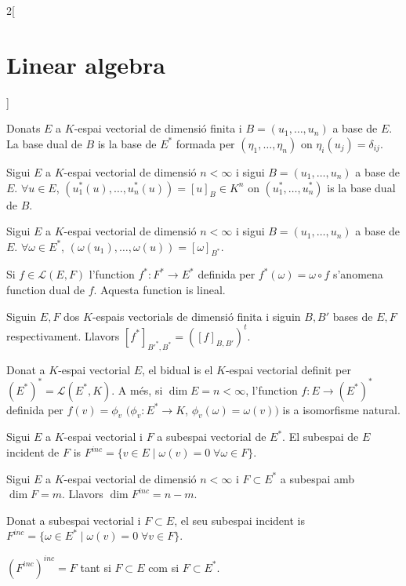 \documentclass[../../../main.tex]{subfiles}
\begin{document}
\begin{multicols}{2}[\section{Linear algebra}]
\begin{definition}
\end{definition}
\begin{definition}
Donats $E$ a $K$-espai vectorial de dimensió finita i $B=(u_1,\ldots,u_n)$ a base de $E$. La base dual de $B$ is la base de $E^*$ formada per $(\eta_1,\ldots,\eta_n)$ on $\eta_i(u_j)=\delta_{ij}$.
\end{definition}
\begin{lemma}
Sigui $E$ a $K$-espai vectorial de dimensió $n<\infty$ i sigui $B=(u_1,\ldots,u_n)$ a base de $E$. $\forall u\in E$, $(u_1^*(u),\ldots,u_n^*(u))=[u]_B\in K^n$ on $(u_1^*,\ldots,u_n^*)$ is la base dual de $B$.
\end{lemma}
\begin{lemma}
Sigui $E$ a $K$-espai vectorial de dimensió $n<\infty$ i sigui $B=(u_1,\ldots,u_n)$ a base de $E$. $\forall \omega\in E^*$, $(\omega(u_1),\ldots,\omega(u))=[\omega]_{B^*}$.
\end{lemma}
\begin{definition}
Si $f\in \mathcal{L}(E,F)$ l'function $f^*:F^*\rightarrow E^*$ definida per $f^*(\omega)=\omega\circ f$ s'anomena function dual de $f$. Aquesta function is lineal.
\end{definition}
\begin{theorem}
Siguin $E,F$ dos $K$-espais vectorials de dimensió finita i siguin $B,B'$ bases de $E,F$ respectivament. Llavors $[f^*]_{B'^*,B^*}=([f]_{B,B'})^t$.
\end{theorem}
\begin{definition}
Donat a $K$-espai vectorial $E$, el bidual is el $K$-espai vectorial definit per $(E^*)^*=\mathcal{L}(E^*,K)$. A més, si $\dim E=n<\infty$, l'function $f:E\rightarrow (E^*)^*$ definida per $f(v)=\phi_v$ $(\phi_v:E^*\rightarrow K$, $\phi_v(\omega)=\omega(v))$ is a isomorfisme natural. 
\end{definition}
\begin{definition}
Sigui $E$ a $K$-espai vectorial i $F$ a subespai vectorial de $E^*$. El subespai de $E$ incident de $F$ is $F^{inc}=\{v\in E\mid \omega(v)=0\;\forall\omega\in F\}$.
\end{definition}
\begin{theorem}
Sigui $E$ a $K$-espai vectorial de dimensió $n<\infty$ i $F\subset E^*$ a subespai amb $\dim F=m$. Llavors $\dim F^{inc}=n-m$.
\end{theorem}
\begin{definition}
Donat a subespai vectorial i $F\subset E$, el seu subespai incident is $F^{inc}=\{\omega\in E^*\mid \omega(v)=0\;\forall v\in F\}$.
\end{definition}
\begin{prop}
$(F^{inc})^{inc}=F$ tant si $F\subset E$ com si $F\subset E^*$.
\end{prop}

\end{multicols}
\end{document}
